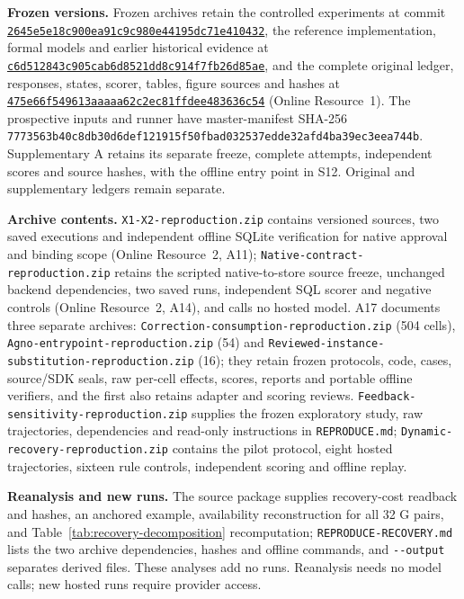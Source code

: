 \documentclass[pdflatex,sn-basic]{sn-jnl}
\begin{document}
\textbf{Frozen versions.} Frozen archives retain the controlled experiments at commit \href{https://github.com/lhh666-6/auto-dete/tree/2645e5e18c900ea91c9c980e44195dc71e410432/DKE-supplement}{\nolinkurl{2645e5e18c900ea91c9c980e44195dc71e410432}}, the reference implementation, formal models and earlier historical evidence at \href{https://github.com/lhh666-6/auto-dete/tree/c6d512843c905cab6d8521dd8c914f7fb26d85ae/latest}{\nolinkurl{c6d512843c905cab6d8521dd8c914f7fb26d85ae}}, and the complete original ledger, responses, states, scorer, tables, figure sources and hashes at \href{https://github.com/lhh666-6/auto-dete/tree/475e66f549613aaaaa62c2ec81ffdee483636c54/cloud-handoff}{\nolinkurl{475e66f549613aaaaa62c2ec81ffdee483636c54}} (Online Resource~1). The prospective inputs and runner have master-manifest SHA-256 \nolinkurl{7773563b40c8db30d6def121915f50fbad032537edde32afd4ba39ec3eea744b}. Supplementary A retains its separate freeze, complete attempts, independent scores and source hashes, with the offline entry point in S12. Original and supplementary ledgers remain separate.

\textbf{Archive contents.} {\nolinkurl{X1-X2-reproduction.zip}} contains versioned sources, two saved executions and independent offline SQLite verification for native approval and binding scope (Online Resource~2, A11); {\nolinkurl{Native-contract-reproduction.zip}} retains the scripted native-to-store source freeze, unchanged backend dependencies, two saved runs, independent SQL scorer and negative controls (Online Resource~2, A14), and calls no hosted model. A17 documents three separate archives: {\nolinkurl{Correction-consumption-reproduction.zip}} (504 cells), {\nolinkurl{Agno-entrypoint-reproduction.zip}} (54) and {\nolinkurl{Reviewed-instance-substitution-reproduction.zip}} (16); they retain frozen protocols, code, cases, source/SDK seals, raw per-cell effects, scores, reports and portable offline verifiers, and the first also retains adapter and scoring reviews. {\nolinkurl{Feedback-sensitivity-reproduction.zip}} supplies the frozen exploratory study, raw trajectories, dependencies and read-only instructions in \texttt{REPRODUCE.md}; {\nolinkurl{Dynamic-recovery-reproduction.zip}} contains the pilot protocol, eight hosted trajectories, sixteen rule controls, independent scoring and offline replay.

\textbf{Reanalysis and new runs.} The source package supplies recovery-cost readback and hashes, an anchored example, availability reconstruction for all 32 G pairs, and Table~\ref{tab:recovery-decomposition} recomputation; \texttt{REPRODUCE-RECOVERY.md} lists the two archive dependencies, hashes and offline commands, and \texttt{-{}-output} separates derived files. These analyses add no runs. Reanalysis needs no model calls; new hosted runs require provider access.
\end{document}
